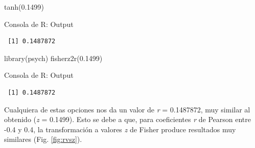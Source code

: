 \documentclass[
  bookmarksnumbered]{article}
\newenvironment{Shaded}{\begin{snugshade}}{\end{snugshade}}
\newcommand{\FloatTok}[1]{\textcolor[rgb]{0.69,0.50,0.00}{#1}}
\newcommand{\FunctionTok}[1]{\textcolor[rgb]{0.39,0.29,0.61}{#1}}
\newcommand{\NormalTok}[1]{\textcolor[rgb]{0.12,0.11,0.11}{#1}}
\begin{document}
\begin{Shaded}
\begin{Highlighting}[]
\FunctionTok{tanh}\NormalTok{(}\FloatTok{0.1499}\NormalTok{)}
\end{Highlighting}
\end{Shaded}

\begin{ROut}{Consola de R: Output~\thetcbcounter}
                \begin{footnotesize}
                \begin{verbatim} [1] 0.1487872
 \end{verbatim}
                \end{footnotesize}
                \end{ROut}

\begin{Shaded}
\begin{Highlighting}[]
\FunctionTok{library}\NormalTok{(psych)}
\FunctionTok{fisherz2r}\NormalTok{(}\FloatTok{0.1499}\NormalTok{)}
\end{Highlighting}
\end{Shaded}

\begin{ROut}{Consola de R: Output~\thetcbcounter}
                \begin{footnotesize}
                \begin{verbatim} [1] 0.1487872
 \end{verbatim}
                \end{footnotesize}
                \end{ROut}

Cualquiera de estas opciones nos da un valor de \emph{r} = 0.1487872, muy similar al obtenido (\emph{z} = 0.1499). Esto se debe a que, para coeficientes \emph{r} de Pearson entre -0.4 y 0.4, la transformación a valores \emph{z} de Fisher produce resultados muy similares (Fig. \ref{fig:rvsz}).
\end{document}
